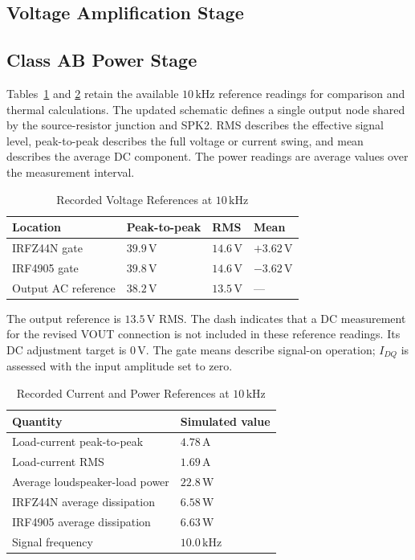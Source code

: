 \documentclass[conference,letterpaper]{IEEEtran}
\newcommand{\V}{\mathrm{V}}
\newcommand{\A}{\mathrm{A}}
\newcommand{\W}{\mathrm{W}}
\newcommand{\kHz}{\mathrm{kHz}}
\begin{document}
\subsection{Voltage Amplification Stage}

\subsection{Class AB Power Stage}

Tables~\ref{tab:voltages} and \ref{tab:powers} retain the available
$10\,\kHz$ reference readings for comparison and thermal calculations.
The updated schematic defines a single output node shared by the
source-resistor junction and SPK2. RMS describes the effective signal level, peak-to-peak describes
the full voltage or current swing, and mean describes the average DC
component. The power readings are average values over the measurement
interval.

\begin{table}[H]
\caption{Recorded Voltage References at $10\,\kHz$}
\label{tab:voltages}
\centering\footnotesize
\setlength{\tabcolsep}{2.5pt}
\begin{tabular}{@{}p{}p{}p{}p{}@{}}
\toprule
Location & Peak-to-peak & RMS & Mean\\
\midrule
IRFZ44N gate & $39.9\,\V$ & $14.6\,\V$ & $+3.62\,\V$\\
IRF4905 gate & $39.8\,\V$ & $14.6\,\V$ & $-3.62\,\V$\\
Output AC reference & $38.2\,\V$ & $13.5\,\V$ & ---\\
\bottomrule
\end{tabular}
\end{table}
\FloatBarrier

The output reference is $13.5\,\V$ RMS. The dash indicates that a
DC measurement for the revised VOUT connection is not included in
these reference readings. Its DC adjustment target is $0\,\V$.
The gate means describe signal-on operation; $I_{DQ}$ is assessed
with the input amplitude set to zero.

\begin{table}[H]
\caption{Recorded Current and Power References at $10\,\kHz$}
\label{tab:powers}
\centering\footnotesize
\begin{tabular}{@{}p{}p{}@{}}
\toprule
Quantity & Simulated value\\
\midrule
Load-current peak-to-peak & $4.78\,\A$\\
Load-current RMS & $1.69\,\A$\\
Average loudspeaker-load power & $22.8\,\W$\\
IRFZ44N average dissipation & $6.58\,\W$\\
IRF4905 average dissipation & $6.63\,\W$\\
Signal frequency & $10.0\,\kHz$\\
\bottomrule
\end{tabular}
\end{table}
\FloatBarrier
\end{document}
